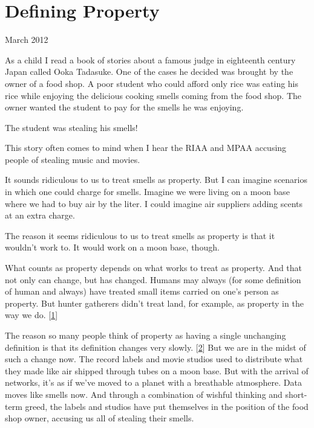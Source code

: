 \chapter{Defining Property}


            
              
                

March 2012

As a child I read a book of stories
                  about a famous judge in eighteenth century Japan called Ooka
                  Tadasuke. One of the cases he decided was brought by the owner
                  of a food shop. A poor student who could afford only rice was
                  eating his rice while enjoying the delicious cooking smells
                  coming from the food shop. The owner wanted the student to pay
                  for the smells he was enjoying.

The student was
                  stealing his smells!

This story often comes to mind
                  when I hear the RIAA and MPAA accusing people of stealing
                  music and movies.

It sounds ridiculous to us to
                  treat smells as property. But I can imagine scenarios in which
                  one could charge for smells. Imagine we were living on a moon
                  base where we had to buy air by the liter. I could imagine air
                  suppliers adding scents at an extra charge.

The
                  reason it seems ridiculous to us to treat smells as property
                  is that it wouldn't work to. It would work on a moon base,
                  though.

What counts as property depends on what
                  works to treat as property. And that not only can change, but
                  has changed. Humans may always (for some definition of human
                  and always) have treated small items carried on one's person
                  as property. But hunter gatherers didn't treat land, for
                  example, as property in the way we do.
                  [\href{\#f1n}{1}]

The reason so many people think of property as
                  having a single unchanging definition is that its definition
                  changes very slowly.
                  [\href{\#f2n}{2}]
                  But we are in the midst of such a change now. The record
                  labels and movie studios used to distribute what they made
                  like air shipped through tubes on a moon base. But with the
                  arrival of networks, it's as if we've moved to a planet with a
                  breathable atmosphere. Data moves like smells now. And through
                  a combination of wishful thinking and short-term greed, the
                  labels and studios have put themselves in the position of the
                  food shop owner, accusing us all of stealing their smells.

